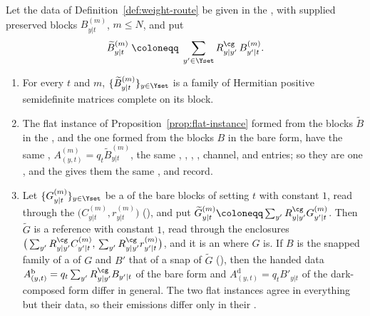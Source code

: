 \begin{proposition}\label{prop:precomposed-blocks}
Let the data of Definition~\ref{def:weight-route} be given in the
, with supplied preserved blocks $B^{(m)}_{y|t}$, $m\le N$,
and put
\begin{equation}\label{eq:precomposed}
  \widetilde B^{(m)}_{y|t}\;\coloneqq\;\sum_{y'\in\Yset}R^{\cg}_{y|y'}\,B^{(m)}_{y'|t}.
\end{equation}
\begin{enumerate}[label=(\roman*),leftmargin=3.0em]
\item For every $t$ and $m$, $\{\widetilde B^{(m)}_{y|t}\}_{y\in\Yset}$ is a
  family of Hermitian positive semidefinite matrices complete on its block.
\item The flat instance of Proposition~\ref{prop:flat-instance} formed from
  the blocks $\widetilde B$ in the , and the one
  formed from the blocks $B$ in the bare form, have the same
  , $A^{(m)}_{(y,t)}=q_t\widetilde B^{(m)}_{y|t}$, the same
  , , ,
  , channel,  and
  entries; so they are one , and the
   gives them the same ,
   and record.
\item Let $\{G^{(m)}_{y|t}\}_{y\in\Yset}$ be a  of the bare
  blocks of setting $t$ with constant $1$, read through the
  $\big(C^{(m)}_{y|t},r^{(m)}_{y|t}\big)$
  (), and put
  $\widetilde G^{(m)}_{y|t}\coloneqq\sum_{y'}R^{\cg}_{y|y'}G^{(m)}_{y'|t}$.
  Then $\widetilde G$ is a reference with constant $1$, read through the
  enclosures
  $\big(\sum_{y'}R^{\cg}_{y|y'}C^{(m)}_{y'|t},\,\sum_{y'}R^{\cg}_{y|y'}r^{(m)}_{y'|t}\big)$,
  and it is an  where $G$ is. If $B$ is the
  snapped family of a  of $G$ and $B'$ that of a snap of
  $\widetilde G$ (), then the handed data
  $A^{\mathrm{b}}_{(y,t)}=q_t\sum_{y'}R^{\cg}_{y|y'}B_{y'|t}$ of the bare
  form and $A^{\mathrm{d}}_{(y,t)}=q_tB'_{y|t}$ of the dark-composed form
  differ in general. The two flat instances agree in everything but their
  data, so their emissions differ only in their
  .
\end{enumerate}
\end{proposition}

